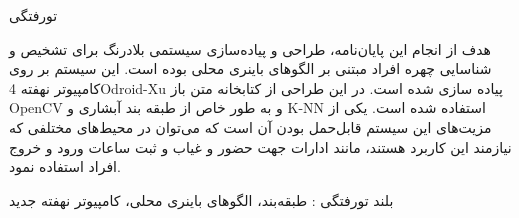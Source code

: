 


‌تورفتگی


هدف از انجام این پایان‌نامه، طراحی و پیاده‌سازی سیستمی بلادرنگ
برای تشخیص و شناسایی چهره افراد مبتنی بر الگو‌های باینری محلی بوده است. این سیستم بر روی کامپیوتر نهفته
4Odroid-Xu پیاده سازی شده است.
در این طراحی از کتابخانه متن باز
OpenCV
و به طور خاص از طبقه بند آبشاری و K-NN استفاده شده است.
یکی از مزیت‌های این سیستم قابل‌حمل بودن آن است که می‌توان در محیط‌های مختلفی که نیازمند این کاربرد هستند، مانند ادارات جهت حضور و غیاب و ثبت ساعات ورود و خروج افراد استفاده نمود.

‌بلند
‌تورفتگی :
طبقه‌بند، الگو‌های باینری محلی، کامپیوتر نهفته
‌جدید
